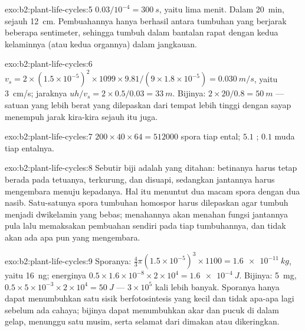 \begin{solution}{exo:b2:plant-life-cycles:5}
$0.03/10^{-4} = \qty{300}{s}$, yaitu lima menit. Dalam \qty{20}{min},
sejauh \qty{12}{cm}. Pembuahannya hanya berhasil antara tumbuhan yang
berjarak beberapa sentimeter, sehingga  tumbuh dalam bantalan
rapat dengan kedua kelaminnya (atau kedua organnya) dalam jangkauan.
\end{solution}

\begin{solution}{exo:b2:plant-life-cycles:6}
$v_s = 2\times(1.5\times 10^{-5})^2\times 1099\times 9.81/(9\times
1.8\times 10^{-5}) = \qty{0.030}{m/s}$, yaitu \qty{3}{cm/s}; jaraknya $uh/v_s
= 2\times 0.5/0.03 = \qty{33}{m}$. Bijinya: $2\times 20/0.8 =
\qty{50}{m}$ --- satuan yang lebih berat yang dilepaskan dari tempat
lebih tinggi dengan sayap menempuh jarak kira-kira sejauh itu juga.
\end{solution}

\begin{solution}{exo:b2:plant-life-cycles:7}
$200\times 40\times 64 = \num{512000}$ spora tiap ental; $5.1$
; $0.1$  muda tiap entalnya.
\end{solution}

\begin{solution}{exo:b2:plant-life-cycles:8}
Sebutir biji adalah  yang ditahan:  betinanya harus
tetap berada pada tetuanya, terkurung, dan disuapi, sedangkan 
jantannya harus mengembara menuju kepadanya. Hal itu menuntut dua macam
spora dengan dua nasib. Satu-satunya spora tumbuhan homospor harus
dilepaskan agar tumbuh menjadi  dwikelamin yang bebas;
menahannya akan menahan fungsi jantannya pula lalu memaksakan pembuahan
sendiri pada tiap tumbuhannya, dan tidak akan ada apa pun yang
mengembara.
\end{solution}

\begin{solution}{exo:b2:plant-life-cycles:9}
Sporanya: $\tfrac43\pi(1.5\times 10^{-5})^3\times 1100 =
\qty{1.6e-11}{kg}$, yaitu \qty{16}{ng}; energinya $0.5\times 1.6\times
10^{-8}\times 2\times 10^{4} = \qty{1.6e-4}{J}$. Bijinya: \qty{5}{mg},
$0.5\times 5\times 10^{-3}\times 2\times 10^{4} = \qty{50}{J}$ ---
$3\times 10^{5}$ kali lebih banyak. Sporanya hanya dapat menumbuhkan
satu sisik berfotosintesis yang kecil dan tidak apa-apa lagi sebelum
ada cahaya; bijinya dapat menumbuhkan akar dan pucuk di dalam gelap,
menunggu satu musim, serta selamat dari dimakan atau dikeringkan.
\end{solution}


